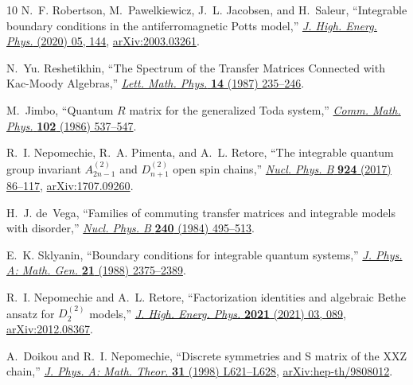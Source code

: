 \documentclass[12pt]{article}
\numberwithin{equation}{section}
\begin{document}
\begin{thebibliography}{10}
		N.~F. Robertson, M.~Pawelkiewicz, J.~L. Jacobsen, and H.~Saleur, ``Integrable
		boundary conditions in the antiferromagnetic {Potts} model,''
		\href{http://dx.doi.org/10.1007/JHEP05(2020)144}{{\em J. High. Energ. Phys.}
			(2020) 05, 144}, \href{http://arxiv.org/abs/2003.03261}{{\ttfamily
				arXiv:2003.03261}}.
		
		N.~{\relax Yu}. Reshetikhin, ``{T}he {S}pectrum of the {T}ransfer {M}atrices
		{C}onnected with {K}ac-{M}oody {A}lgebras,''
		\href{http://dx.doi.org/https://doi.org/10.1007/BF00416853}{{\em Lett. Math.
				Phys.} {\bfseries 14} (1987) 235--246}.
		
		M.~Jimbo, ``{Q}uantum ${R}$ matrix for the generalized {T}oda system,''
		\href{http://dx.doi.org/10.1007/BF01221646}{{\em Comm. Math. Phys.}
			{\bfseries 102} (1986) 537--547}.
		
		R.~I. Nepomechie, R.~A. Pimenta, and A.~L. Retore, ``{T}he integrable quantum
		group invariant {$A_{2n-1}^{(2)}$} and {$D_{n+1}^{(2)}$} open spin chains,''
		\href{http://dx.doi.org/10.1016/j.nuclphysb.2017.09.004}{{\em Nucl. Phys. B}
			{\bfseries 924} (2017) 86--117},
		\href{http://arxiv.org/abs/1707.09260}{{\ttfamily arXiv:1707.09260}}.
		
		H.~J. de~Vega, ``{Families of commuting transfer matrices and integrable models
			with disorder},'' \href{http://dx.doi.org/10.1016/0550-3213(84)90240-2}{{\em
				Nucl. Phys. B} {\bfseries 240} (1984) 495--513}.
		
		E.~K. Sklyanin, ``{{B}oundary conditions for integrable quantum systems},''
		\href{http://dx.doi.org/10.1088/0305-4470/21/10/015}{{\em J. Phys. A: Math.
				Gen.} {\bfseries 21} (1988) 2375--2389}.
		
		R.~I. Nepomechie and A.~L. Retore, ``Factorization identities and algebraic
		{B}ethe ansatz for {$D^{(2)}_{2}$} models,''
		\href{http://dx.doi.org/10.1007/JHEP03(2021)089}{{\em J. High. Energ. Phys.}
			{\bfseries 2021} (2021) 03, 089},
		\href{http://arxiv.org/abs/2012.08367}{{\ttfamily arXiv:2012.08367}}.
		
		A.~Doikou and R.~I. Nepomechie, ``{Discrete symmetries and S matrix of the XXZ
			chain},'' \href{http://dx.doi.org/10.1088/0305-4470/31/37/001}{{\em J. Phys.
				A: Math. Theor.} {\bfseries 31} (1998) L621--L628},
		\href{http://arxiv.org/abs/hep-th/9808012}{{\ttfamily arXiv:hep-th/9808012}}.
		

\end{thebibliography}
\end{document}
